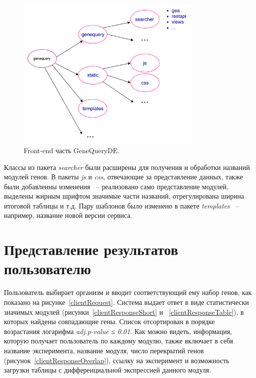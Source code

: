 \documentclass[times,specification,annotation]{itmo-student-thesis}
\begin{document}
\begin{figure}[!h]
    \caption{Front-end часть GeneQueryDE.}\label{genequery-web}
    \centering
    \includegraphics[width=0.8\textwidth]{genequery-web.png}
\end{figure}

Классы из пакета \textit{searcher} были расширены для получения и обработки названий модулей генов. В пакеты \textit{js} и \textit{css}, отвечающие за представление данных, также были добавленны изменения ~-- реализовано само представление модулей, выделены жирным шрифтом значимые части названий, отрегулирована ширина итоговой таблицы и т.д. Пару шаблонов было изменено в пакете \textit{templates} ~-- например, название новой версии сервиса.   

\section{Представление результатов пользователю}

Пользователь выбирает организм и вводит соответствующий ему набор генов, как показано на рисунке~\ref{clientRequest}. Система выдает ответ в виде статистически значимых модулей (рисунки~\ref{clientResponseShort} и ~\ref{clientResponseTable}), в которых найдены совпадающие гены. Список отсортирован в порядке возрастания логарифма \textit{adj.p-value ≤ 0.01}. Как можно видеть, информация, которую получает пользователь по каждому модулю, также включает в себя название эксперимента, название модуля, число перекрытий генов (рисунок~\ref{clientResponseOverlap}), ссылку на эксперимент и возможность загрузки таблицы с дифференциальной экспрессией данного модуля.
\end{document}

